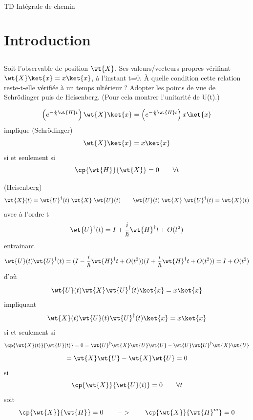 TD Intégrale de chemin

\section{Introduction}
\subsection{}
Soit l'observable de position $\wt{X}$. Ses valeurs/vecteurs propres vérifiant
$\wt{X}\ket{x}=x\ket{x}$, à l'instant t=0. À quelle condition cette relation
reste-t-elle vérifiée à un temps ultérieur ? Adopter les points de vue de
Schrödinger puis de Heisenberg. (Pour cela montrer l'unitarité de U(t).)

\[
\left(e^{-\frac{i}{\hbar}\wt{H}t}\right)\wt{X}\ket{x}
=\left(e^{-\frac{i}{\hbar}\wt{H}t}\right)x\ket{x}
\]
implique (Schrödinger)
\[
\wt{X}\ket{x}=x\ket{x}
\]
si et seulement si
\[
\cp{\wt{H}}{\wt{X}}=0 \qquad \forall t
\]

(Heisenberg)
\[
\wt{X}(t)=\wt{U}^\dagger(t)\;\wt{X}\;\wt{U}(t) \qquad 
\wt{U}(t)\;\wt{X}\;\wt{U}^\dagger(t)=\wt{X}(t)
\]
avec à l'ordre t
\[
\wt{U}^\dagger(t)= I + \frac{i}{\hbar}\wt{H}^\dagger t + O(t^2)
\]
entrainant
\[
\wt{U}(t)\wt{U}^\dagger(t)=
(I - \frac{i}{\hbar}\wt{H}^\dagger t + O(t^2))
(I + \frac{i}{\hbar}\wt{H}^\dagger t + O(t^2)) =
I + O(t^2)
\]
d'où
\[
\wt{U}(t)\wt{X}\wt{U}^\dagger(t)\ket{x} = x \ket{x}
\]
impliquant
\[
\wt{X}(t)\wt{U}(t)\wt{U}^\dagger(t)\ket{x} = x \ket{x}
\]
si et seulement si
\[
\cp{\wt{X}(t)}{\wt{U}(t)} = 0 =
\wt{U}^\dagger\wt{X}\wt{U}\wt{U}-\wt{U}\wt{U}^\dagger\wt{X}\wt{U}
\]
\[
=\wt{X}\wt{U}-\wt{X}\wt{U} = 0
\]
si
\[
\cp{\wt{X}}{\wt{U}(t)} = 0 \qquad \forall t
\]
soit
\[
\cp{\wt{X}}{\wt{H}} = 0 \qquad -> \qquad \cp{\wt{X}}{\wt{H}^m} = 0
\]
